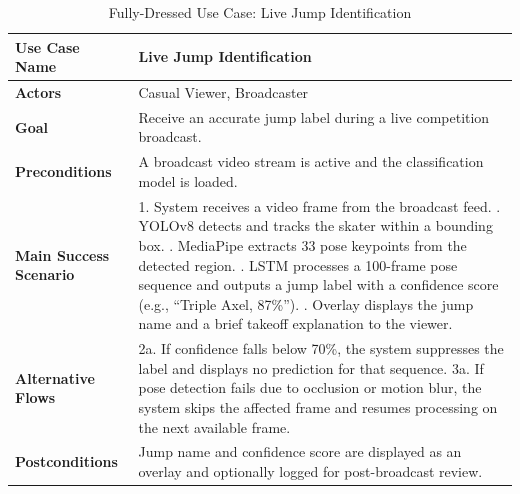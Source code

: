 \begin{table}[h]
    \centering
    \renewcommand{\arraystretch}{1.4}
    \caption{Fully-Dressed Use Case: Live Jump Identification}
    \label{tab:usecase-classify}
    \begin{tabular}{|p{3.5cm}|p{9.5cm}|}
        \hline
        \textbf{Use Case Name}
            & Live Jump Identification \\
        \hline
        \textbf{Actors}
            & Casual Viewer, Broadcaster \\
        \hline
        \textbf{Goal}
            & Receive an accurate jump label during a live competition
              broadcast. \\
        \hline
        \textbf{Preconditions}
            & A broadcast video stream is active and the classification
              model is loaded. \\
        \hline
        \textbf{Main Success Scenario}
            & 1. System receives a video frame from the broadcast feed.
              \newline
              2. YOLOv8 detects and tracks the skater within a bounding
              box. \newline
              3. MediaPipe extracts 33 pose keypoints from the detected
              region. \newline
              4. LSTM processes a 100-frame pose sequence and outputs
              a jump label with a confidence score
              (e.g., ``Triple Axel, 87\%''). \newline
              5. Overlay displays the jump name and a brief takeoff
              explanation to the viewer. \\
        \hline
        \textbf{Alternative Flows}
            & 2a. If confidence falls below 70\%, the system suppresses
              the label and displays no prediction for that sequence.
              \newline
              3a. If pose detection fails due to occlusion or motion
              blur, the system skips the affected frame and resumes
              processing on the next available frame. \\
        \hline
        \textbf{Postconditions}
            & Jump name and confidence score are displayed as an overlay
              and optionally logged for post-broadcast review. \\
        \hline
    \end{tabular}
\end{table}


